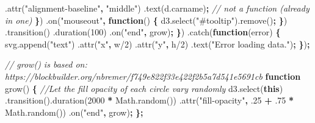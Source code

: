 \documentclass[openany]{book}
\newenvironment{Shaded}{\begin{snugshade}}{\end{snugshade}}
\newcommand{\AttributeTok}[1]{\textcolor[rgb]{0.77,0.63,0.00}{#1}}
\newcommand{\CommentTok}[1]{\textcolor[rgb]{0.56,0.35,0.01}{\textit{#1}}}
\newcommand{\DecValTok}[1]{\textcolor[rgb]{0.00,0.00,0.81}{#1}}
\newcommand{\FloatTok}[1]{\textcolor[rgb]{0.00,0.00,0.81}{#1}}
\newcommand{\KeywordTok}[1]{\textcolor[rgb]{0.13,0.29,0.53}{\textbf{#1}}}
\newcommand{\NormalTok}[1]{#1}
\newcommand{\OperatorTok}[1]{\textcolor[rgb]{0.81,0.36,0.00}{\textbf{#1}}}
\newcommand{\StringTok}[1]{\textcolor[rgb]{0.31,0.60,0.02}{#1}}
\newcommand{\VariableTok}[1]{\textcolor[rgb]{0.00,0.00,0.00}{#1}}
\begin{document}
\begin{Shaded}
\begin{Highlighting}[]
\NormalTok{          .}\AttributeTok{attr}\NormalTok{(}\StringTok{"alignment-baseline"}\OperatorTok{,} \StringTok{"middle"}\NormalTok{)}
\NormalTok{          .}\AttributeTok{text}\NormalTok{(}\VariableTok{d}\NormalTok{.}\AttributeTok{carname}\NormalTok{)}\OperatorTok{;} \CommentTok{// not a function (already in one)}
      \OperatorTok{\}}\NormalTok{)}
\NormalTok{      .}\AttributeTok{on}\NormalTok{(}\StringTok{"mouseout"}\OperatorTok{,} \KeywordTok{function}\NormalTok{() }\OperatorTok{\{}
        \VariableTok{d3}\NormalTok{.}\AttributeTok{select}\NormalTok{(}\StringTok{"#tooltip"}\NormalTok{).}\AttributeTok{remove}\NormalTok{()}\OperatorTok{;}
      \OperatorTok{\}}\NormalTok{)}
\NormalTok{      .}\AttributeTok{transition}\NormalTok{()}
\NormalTok{      .}\AttributeTok{duration}\NormalTok{(}\DecValTok{100}\NormalTok{)}
\NormalTok{      .}\AttributeTok{on}\NormalTok{(}\StringTok{"end"}\OperatorTok{,}\NormalTok{ grow)}\OperatorTok{;}
  \OperatorTok{\}}\NormalTok{)}
\NormalTok{  .}\AttributeTok{catch}\NormalTok{(}\KeywordTok{function}\NormalTok{(error) }\OperatorTok{\{}
    \VariableTok{svg}\NormalTok{.}\AttributeTok{append}\NormalTok{(}\StringTok{"text"}\NormalTok{)}
\NormalTok{      .}\AttributeTok{attr}\NormalTok{(}\StringTok{"x"}\OperatorTok{,}\NormalTok{ w/}\DecValTok{2}\NormalTok{)}
\NormalTok{      .}\AttributeTok{attr}\NormalTok{(}\StringTok{"y"}\OperatorTok{,}\NormalTok{ h/}\DecValTok{2}\NormalTok{)}
\NormalTok{      .}\AttributeTok{text}\NormalTok{(}\StringTok{"Error loading data."}\NormalTok{)}\OperatorTok{;}
  \OperatorTok{\}}\NormalTok{)}\OperatorTok{;}

\CommentTok{// grow() is based on: https://blockbuilder.org/nbremer/f749e822f33e422f2b5a7d541e5691cb}
\KeywordTok{function} \AttributeTok{grow}\NormalTok{() }\OperatorTok{\{}
  \CommentTok{//Let the fill opacity of each circle vary randomly}
  \VariableTok{d3}\NormalTok{.}\AttributeTok{select}\NormalTok{(}\KeywordTok{this}\NormalTok{)}
\NormalTok{    .}\AttributeTok{transition}\NormalTok{().}\AttributeTok{duration}\NormalTok{(}\DecValTok{2000} \OperatorTok{*} \VariableTok{Math}\NormalTok{.}\AttributeTok{random}\NormalTok{())}
\NormalTok{    .}\AttributeTok{attr}\NormalTok{(}\StringTok{"fill-opacity"}\OperatorTok{,} \FloatTok{.25} \OperatorTok{+} \FloatTok{.75} \OperatorTok{*} \VariableTok{Math}\NormalTok{.}\AttributeTok{random}\NormalTok{())}
\NormalTok{    .}\AttributeTok{on}\NormalTok{(}\StringTok{"end"}\OperatorTok{,}\NormalTok{ grow)}\OperatorTok{;}
\OperatorTok{\};}
\end{Highlighting}
\end{Shaded}
\end{document}
